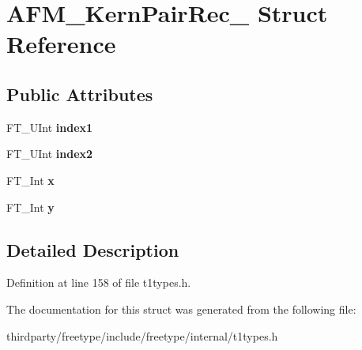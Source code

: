 \hypertarget{struct_a_f_m___kern_pair_rec__}{}\section{A\+F\+M\+\_\+\+Kern\+Pair\+Rec\+\_\+ Struct Reference}
\label{struct_a_f_m___kern_pair_rec__}
\subsection*{Public Attributes}
\begin{DoxyCompactItemize}
\item 
\mbox{\label{struct_a_f_m___kern_pair_rec___afe63c264dd0b4eab36185b1cb2997316}} 
F\+T\+\_\+\+U\+Int {\bfseries index1}
\item 
\mbox{\label{struct_a_f_m___kern_pair_rec___a2ed7998a1287c64ca6074ecfe740116e}} 
F\+T\+\_\+\+U\+Int {\bfseries index2}
\item 
\mbox{\label{struct_a_f_m___kern_pair_rec___a4b7f90a0e17ed89353fec14ddb29fa12}} 
F\+T\+\_\+\+Int {\bfseries x}
\item 
\mbox{\label{struct_a_f_m___kern_pair_rec___aa177aa612e79701261eba72c76ea3f08}} 
F\+T\+\_\+\+Int {\bfseries y}
\end{DoxyCompactItemize}


\subsection{Detailed Description}


Definition at line 158 of file t1types.\+h.



The documentation for this struct was generated from the following file\+:\begin{DoxyCompactItemize}
\item 
thirdparty/freetype/include/freetype/internal/t1types.\+h\end{DoxyCompactItemize}
